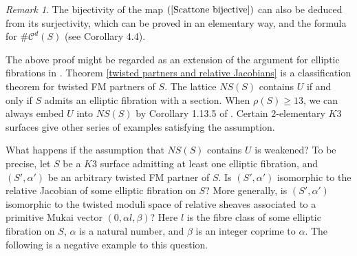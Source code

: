 \documentclass{article}
\theoremstyle{plain}
\theoremstyle{definition}
\theoremstyle{remark}
\newtheorem{remark}{Remark}%
\begin{document}
\begin{remark}
The bijectivity of the map $(\ref{Scattone  bijective})$ 
can also be deduced from its surjectivity,  which can be proved in an elementary way,    
and the formula for $\# \mathcal{C}^{d}(S)$ (see \cite{Ma2} Corollary 4.4). 
\end{remark}




The above proof might be regarded as an extension of the argument for elliptic fibrations in \cite{PS-S}.  
Theorem \ref{twisted partners and relative Jacobians} is a classification theorem 
for twisted FM partners of $S$.   
The lattice $NS(S)$ contains $U$ 
if and only if 
$S$ admits an elliptic fibration with a section.   
When 
$\rho (S)  \geq 13$,  
we can always embed $U$ into $NS(S)$ by Corollary 1.13.5 of \cite{Ni}.   
Certain $2$-elementary $K3$ surfaces 
give other series of examples satisfying the assumption.  










What happens if the assumption that $NS(S)$ contains $U$ is weakened?  
To be precise, 
let $S$ be a $K3$ surface admitting at least one elliptic fibration,    
and $(S', \alpha ')$ be an arbitrary twisted FM partner of $S$.  
Is $(S', \alpha ')$ 
isomorphic to the relative Jacobian of some elliptic fibration on $S$?  
More generally,  
is $(S', \alpha ')$ isomorphic to the twisted moduli space of relative sheaves associated to 
a primitive Mukai vector $(0, \alpha l, \beta )$?   
Here $l$ is the fibre class of some elliptic fibration on $S$,  
$\alpha $ is a natural number,  
and $\beta $ is an integer coprime to $\alpha $.   
The following is a negative example to this question.  
\end{document}
